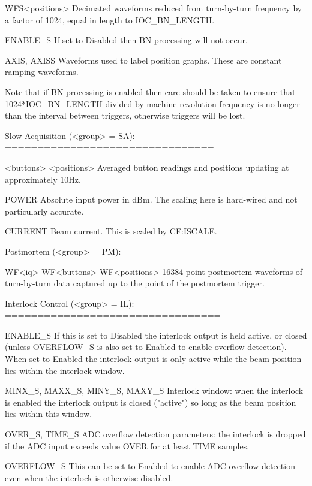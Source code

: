 \documentclass[a4paper,fleqn]{article}
\begin{document}
    WFS<positions>
        Decimated waveforms reduced from turn-by-turn frequency by a factor of
        1024, equal in length to IOC\_BN\_LENGTH.

    ENABLE\_S
        If set to Disabled then BN processing will not occur.

    AXIS, AXISS
        Waveforms used to label position graphs.  These are constant ramping
        waveforms.

Note that if BN processing is enabled then care should be taken to ensure that
1024*IOC\_BN\_LENGTH divided by machine revolution frequency is no longer than
the interval between triggers, otherwise triggers will be lost.


Slow Acquisition (<group> = SA):
================================

    <buttons>
    <positions>
        Averaged button readings and positions updating at approximately 10Hz.
        
    POWER
        Absolute input power in dBm.  The scaling here is hard-wired and not
        particularly accurate.

    CURRENT
        Beam current.  This is scaled by CF:ISCALE.


Postmortem (<group> = PM):
==========================

    WF<iq>
    WF<buttons>
    WF<positions>
        16384 point postmortem waveforms of turn-by-turn data captured up to
        the point of the postmortem trigger.


Interlock Control (<group> = IL):
=================================

    ENABLE\_S
        If this is set to Disabled the interlock output is held active, or
        closed (unless OVERFLOW\_S is also set to Enabled to enable overflow
        detection).  When set to Enabled the interlock output is only active
        while the beam position lies within the interlock window.

    MINX\_S, MAXX\_S, MINY\_S, MAXY\_S
        Interlock window: when the interlock is enabled the interlock output
        is closed ("active") so long as the beam position lies within this
        window. 

    OVER\_S, TIME\_S
        ADC overflow detection parameters: the interlock is dropped if the ADC
        input exceeds value OVER for at least TIME samples.

    OVERFLOW\_S
        This can be set to Enabled to enable ADC overflow detection even when
        the interlock is otherwise disabled.
\end{document}
